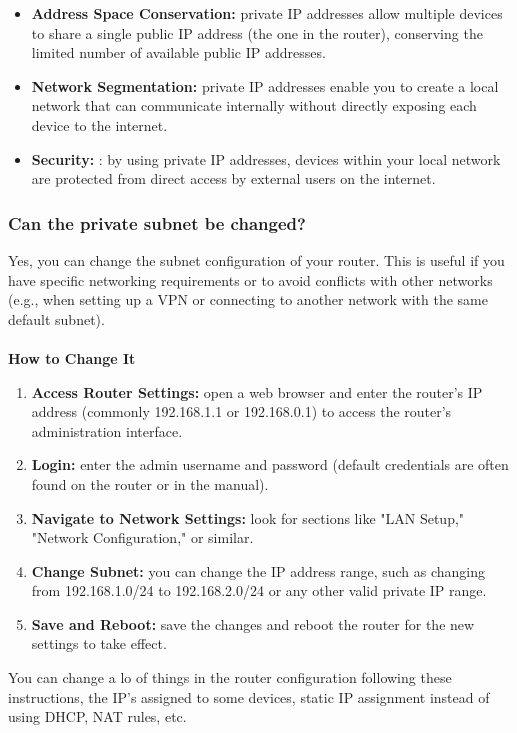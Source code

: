 \documentclass{article}
\newenvironment{blocktemplate}[1]{%
    \tcolorbox[beamer,%
    noparskip,breakable,
    colframe=Blue,%
    colbacklower=LimeGreen!75!LightGreen,%
    title=#1]}%
    {\endtcolorbox}
\begin{document}
\begin{itemize}
    \item \textbf{Address Space Conservation:} private IP addresses allow multiple devices to share a single public IP address (the one in the router), conserving the limited number of available public IP addresses.
    \item \textbf{Network Segmentation:} private IP addresses enable you to create a local network that can communicate internally without directly exposing each device to the internet.
    \item \textbf{Security:} : by using private IP addresses, devices within your local network are protected from direct access by external users on the internet.
\end{itemize}

\subsubsection{Can the private subnet be changed?}

Yes, you can change the subnet configuration of your router. This is useful if you have specific networking requirements or to avoid conflicts with other networks (e.g., when setting up a VPN or connecting to another network with the same default subnet).
\\\\
\textbf{How to Change It}
\begin{enumerate}
    \item \textbf{Access Router Settings:} open a web browser and enter the router's IP address (commonly 192.168.1.1 or 192.168.0.1) to access the router’s administration interface.
    \item \textbf{Login:} enter the admin username and password (default credentials are often found on the router or in the manual).
    \item \textbf{Navigate to Network Settings:} look for sections like "LAN Setup," "Network Configuration," or similar.
    \item \textbf{Change Subnet:} you can change the IP address range, such as changing from 192.168.1.0/24 to 192.168.2.0/24 or any other valid private IP range.
    \item \textbf{Save and Reboot:} save the changes and reboot the router for the new settings to take effect.
\end{enumerate}

\begin{blocktemplate}{NOTE}
You can change a lo of things in the router configuration following these instructions, the IP's assigned to some devices, static IP assignment instead of using DHCP, NAT rules, etc.
\end{blocktemplate}
\end{document}
